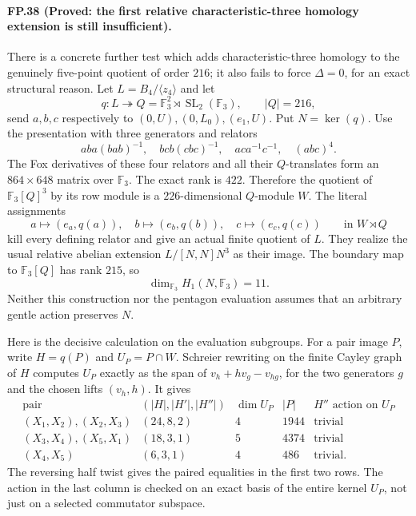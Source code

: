 \paragraph{FP.38 (Proved: the first relative characteristic-three homology extension is still insufficient).}
There is a concrete further test which adds characteristic-three
homology to the genuinely five-point quotient of order $216$;
it also fails to force $\Delta=0$, for an exact structural reason.
Let $L=B_4/\langle z_4\rangle$ and let
\[
 q:L\twoheadrightarrow Q=\mathbb F_3^2\rtimes
                 \operatorname{SL}_2(\mathbb F_3),\qquad |Q|=216,
\]
send $a,b,c$ respectively to $(0,U),(0,L_0),(e_1,U)$.
Put $N=\ker(q)$. Use the presentation with three generators
and relators
\[
 aba(bab)^{-1},\quad bcb(cbc)^{-1},\quad aca^{-1}c^{-1},
                  \quad(abc)^4.
\]
The Fox derivatives of these four relators and all their
$Q$-translates form an $864\times648$ matrix over $\mathbb F_3$.
The exact rank is $422$. Therefore the quotient of
$\mathbb F_3[Q]^3$ by its row module is a $226$-dimensional
$Q$-module $W$. The literal assignments
\[
       a\longmapsto(e_a,q(a)),\quad
       b\longmapsto(e_b,q(b)),\quad
       c\longmapsto(e_c,q(c))
           \qquad\text{in } W\rtimes Q
 \tag{FP.38.1}
\]
kill every defining relator and give an actual finite quotient
of $L$. They realize the usual relative abelian extension
$L/[N,N]N^3$ as their image. The boundary map to
$\mathbb F_3[Q]$ has rank $215$, so
\[
                    \dim_{\mathbb F_3}H_1(N,\mathbb F_3)=11.
\]
Neither this construction nor the pentagon evaluation assumes
that an arbitrary gentle action preserves $N$.

Here is the decisive calculation on the evaluation subgroups.
For a pair image $P$, write $H=q(P)$ and
$U_P=P\cap W$. Schreier rewriting on the finite Cayley graph
of $H$ computes $U_P$ exactly as the span of
$v_h+h v_g-v_{hg}$, for the two generators $g$ and the chosen
lifts $(v_h,h)$. It gives
\[
\begin{array}{c|c|c|c|c}
 \text{pair}&(|H|,|H'|,|H''|)&\dim U_P&|P|
       &H''\text{ action on }U_P\\ \hline
 (X_1,X_2),(X_2,X_3)&(24,8,2)&4&1944&\text{trivial}\\
 (X_3,X_4),(X_5,X_1)&(18,3,1)&5&4374&\text{trivial}\\
 (X_4,X_5)&(6,3,1)&4&486&\text{trivial}.
\end{array}
 \tag{FP.38.2}
\]
The reversing half twist gives the paired equalities in the
first two rows. The action in the last column is checked on
an exact basis of the entire kernel $U_P$, not just on a
selected commutator subspace.

